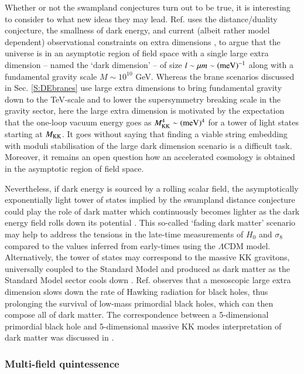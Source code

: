Whether or not the swampland conjectures turn out to be true, it is interesting to consider to what new ideas they may lead. Ref. \cite{Montero:2022prj} uses the distance/duality conjecture, the smallness of dark energy, and current (albeit rather model dependent) observational constraints on extra dimensions \cite{Workman:2022ynf, Hannestad:2003yd}, to argue that the universe is in an asymptotic region of field space with a single large extra dimension -- named the `dark dimension' -- of size $l \sim \mu m \sim ({\rm meV})^{-1}$ along with a fundamental gravity scale $M \sim 10^{10}$ GeV. Whereas the brane scenarios discussed in Sec. \ref{S:DEbranes} use large extra dimensions to bring fundamental gravity down to the TeV-scale and to lower the supersymmetry breaking scale in the gravity sector, here the large extra dimension is motivated by the expectation that the one-loop vacuum energy goes as $M_{\rm KK}^4\sim ({\rm meV})^4$ for a tower of light states starting at $M_{\rm KK}$. It goes without saying that finding a viable string embedding with moduli stabilisation of the large dark dimension scenario is a difficult task. Moreover, it remains an open question how an accelerated cosmology is obtained in the asymptotic region of field space. 

Nevertheless, if dark energy is sourced by a rolling scalar field, the asymptotically exponentially light tower of states implied by the swampland distance conjecture could play the role of dark matter which continuously becomes lighter as the dark energy field rolls down its potential  \cite{Agrawal:2019dlm}. This so-called `fading dark matter' scenario may help to address the tensions in the late-time measurements of $H_0$ and $\sigma_8$ compared to the values inferred from early-times using the $\Lambda$CDM model. Alternatively, the tower of states may correspond to the massive KK gravitons, universally coupled to the Standard Model and produced as dark matter as the Standard Model sector cools down \cite{Gonzalo:2022jac}. Ref. \cite{Anchordoqui:2022txe} observes that a mesoscopic large extra dimension slows down the rate of Hawking radiation for black holes, thus prolonging the survival of low-mass primordial black holes, which can then compose all of dark matter. The correspondence between a 5-dimensional primordial black hole and 5-dimensional massive KK modes interpretation of dark matter was discussed in \cite{Anchordoqui:2022tgp}. 


\subsubsection{Multi-field quintessence} 
\label{S:multiq}

